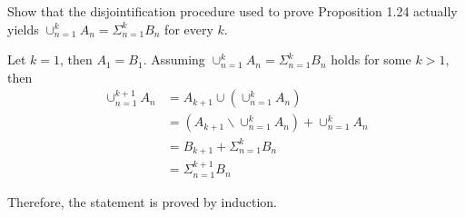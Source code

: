 \begin{exercise}
  Show that the disjointification procedure used to prove Proposition 1.24 actually yields $\cup_{n=1}^k A_n=\Sigma_{n=1}^k B_n$ for every $k$.
\end{exercise}
\begin{solution}
  Let $k=1$, then $A_1=B_1$. Assuming $\cup_{n=1}^k A_n=\Sigma_{n=1}^k B_n$ holds for some $k>1$, then
  \begin{align*}
    \cup_{n=1}^{k+1} A_n &= A_{k+1}\cup (\cup_{n=1}^{k} A_n) \\
      &= (A_{k+1}\backslash\cup_{n=1}^{k} A_n) + \cup_{n=1}^{k} A_n \\
      &= B_{k+1} + \Sigma_{n=1}^k B_n \\
      &= \Sigma_{n=1}^{k+1} B_n
  \end{align*}

  Therefore, the statement is proved by induction.
\end{solution}


